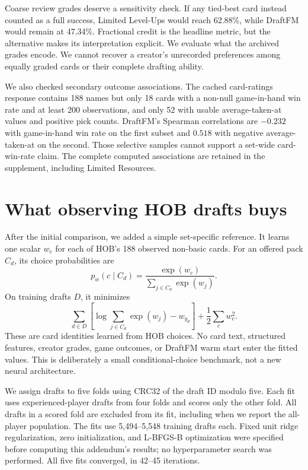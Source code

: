\documentclass[11pt]{article}
\begin{document}
Coarse review grades deserve a sensitivity check. If any tied-best card
instead counted as a full success, Limited Level-Ups would reach 62.88\%,
while DraftFM would remain at 47.34\%. Fractional credit is the headline
metric, but the alternative makes its interpretation explicit. We evaluate
what the archived grades encode. We cannot recover a creator's unrecorded
preferences among equally graded cards or their complete drafting ability.

We also checked secondary outcome associations. The cached card-ratings
response contains 188 names but only 18 cards with a non-null game-in-hand
win rate and at least 200 observations, and only 52 with usable
average-taken-at values and positive pick counts. DraftFM's Spearman
correlations are $-0.232$ with game-in-hand win rate on the first subset and
$0.518$ with negative average-taken-at on the second. Those selective samples
cannot support a set-wide card-win-rate claim. The complete computed
associations are retained in the supplement, including Limited Resources.

\section{What observing HOB drafts buys}

After the initial comparison, we added a simple set-specific reference.
It learns one scalar $w_c$ for each of HOB's 188 observed non-basic cards.
For an offered pack $C_d$, its choice probabilities are
\begin{equation}
 p_w(c\mid C_d)=\frac{\exp(w_c)}{\sum_{j\in C_d}\exp(w_j)}.
\end{equation}
On training drafts $D$, it minimizes
\begin{equation}
 \sum_{d\in D}\left[\log\sum_{j\in C_d}\exp(w_j)-w_{y_d}\right]
 +\frac{1}{2}\sum_c w_c^2.
\end{equation}
These are card identities learned from HOB choices. No card text,
structured features, creator grades, game outcomes, or DraftFM warm start
enter the fitted values. This is deliberately a small conditional-choice
benchmark, not a new neural architecture.

We assign drafts to five folds using CRC32 of the draft ID modulo five.
Each fit uses experienced-player drafts from four folds and scores only
the other fold. All drafts in a scored fold are excluded from its fit,
including when we report the all-player population. The fits use
5,494--5,548 training drafts each. Fixed unit ridge regularization,
zero initialization, and L-BFGS-B optimization were specified before
computing this addendum's results; no hyperparameter search was performed.
All five fits converged, in 42--45 iterations.
\end{document}
